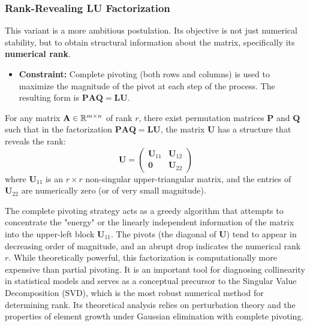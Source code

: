 \subsubsection{Rank-Revealing LU Factorization}
This variant is a more ambitious postulation. Its objective is not just numerical stability, but to obtain structural information about the matrix, specifically its \textbf{numerical rank}.

\begin{itemize}
    \item \textbf{Constraint:} Complete pivoting (both rows and columns) is used to maximize the magnitude of the pivot at each step of the process. The resulting form is $\mathbf{P}\mathbf{A}\mathbf{Q} = \mathbf{L}\mathbf{U}$.
\end{itemize}

\begin{theorem}
For any matrix $\mathbf{A} \in \mathbb{R}^{m \times n}$ of rank $r$, there exist permutation matrices $\mathbf{P}$ and $\mathbf{Q}$ such that in the factorization $\mathbf{P}\mathbf{A}\mathbf{Q} = \mathbf{L}\mathbf{U}$, the matrix $\mathbf{U}$ has a structure that reveals the rank:
\[ \mathbf{U} = \begin{pmatrix} \mathbf{U}_{11} & \mathbf{U}_{12} \\ \mathbf{0} & \mathbf{U}_{22} \end{pmatrix} \]
where $\mathbf{U}_{11}$ is an $r \times r$ non-singular upper-triangular matrix, and the entries of $\mathbf{U}_{22}$ are numerically zero (or of very small magnitude).
\end{theorem}

\begin{remark}
The complete pivoting strategy acts as a greedy algorithm that attempts to concentrate the "energy" or the linearly independent information of the matrix into the upper-left block $\mathbf{U}_{11}$. The pivots (the diagonal of $\mathbf{U}$) tend to appear in decreasing order of magnitude, and an abrupt drop indicates the numerical rank $r$. While theoretically powerful, this factorization is computationally more expensive than partial pivoting. It is an important tool for diagnosing collinearity in statistical models and serves as a conceptual precursor to the Singular Value Decomposition (SVD), which is the most robust numerical method for determining rank. Its theoretical analysis relies on perturbation theory and the properties of element growth under Gaussian elimination with complete pivoting.
\end{remark}